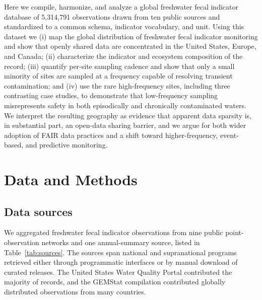\documentclass{agujournal2019}
\begin{document}
Here we compile, harmonize, and analyze a global freshwater fecal indicator database of 5{,}314{,}791 observations drawn from ten public sources and standardized to a common schema, indicator vocabulary, and unit. Using this dataset we (i) map the global distribution of freshwater fecal indicator monitoring and show that openly shared data are concentrated in the United States, Europe, and Canada; (ii) characterize the indicator and ecosystem composition of the record; (iii) quantify per-site sampling cadence and show that only a small minority of sites are sampled at a frequency capable of resolving transient contamination; and (iv) use the rare high-frequency sites, including three contrasting case studies, to demonstrate that low-frequency sampling misrepresents safety in both episodically and chronically contaminated waters. We interpret the resulting geography as evidence that apparent data sparsity is, in substantial part, an open-data sharing barrier, and we argue for both wider adoption of FAIR data practices and a shift toward higher-frequency, event-based, and predictive monitoring.

\section{Data and Methods}

\subsection{Data sources}
We aggregated freshwater fecal indicator observations from nine public point-observation networks and one annual-summary source, listed in Table~\ref{tab:sources}. The sources span national and supranational programs retrieved either through programmatic interfaces or by manual download of curated releases. The United States Water Quality Portal contributed the majority of records, and the GEMStat compilation contributed globally distributed observations from many countries.
\end{document}
